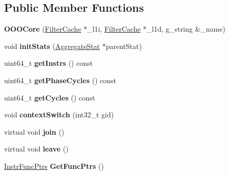 \subsection*{Public Member Functions}
\begin{DoxyCompactItemize}
\item 
\hypertarget{classOOOCore_a8e128fbcf5d1aad568c32303dc45ddd0}{{\bfseries O\-O\-O\-Core} (\hyperlink{classFilterCache}{Filter\-Cache} $\ast$\-\_\-l1i, \hyperlink{classFilterCache}{Filter\-Cache} $\ast$\-\_\-l1d, g\-\_\-string \&\-\_\-name)}\label{classOOOCore_a8e128fbcf5d1aad568c32303dc45ddd0}

\item 
\hypertarget{classOOOCore_a82046d72c1e1e24434dd388f7b5d945c}{void {\bfseries init\-Stats} (\hyperlink{classAggregateStat}{Aggregate\-Stat} $\ast$parent\-Stat)}\label{classOOOCore_a82046d72c1e1e24434dd388f7b5d945c}

\item 
\hypertarget{classOOOCore_a0f799816e26c267127b0a7f2e295921e}{uint64\-\_\-t {\bfseries get\-Instrs} () const }\label{classOOOCore_a0f799816e26c267127b0a7f2e295921e}

\item 
\hypertarget{classOOOCore_a62014c3805f0a2520474e2f0de8d8afb}{uint64\-\_\-t {\bfseries get\-Phase\-Cycles} () const }\label{classOOOCore_a62014c3805f0a2520474e2f0de8d8afb}

\item 
\hypertarget{classOOOCore_a5b527137a0b02e16bd3b8a1c0f38f985}{uint64\-\_\-t {\bfseries get\-Cycles} () const }\label{classOOOCore_a5b527137a0b02e16bd3b8a1c0f38f985}

\item 
\hypertarget{classOOOCore_a396ab9ae4b9e60827474fa0983919146}{void {\bfseries context\-Switch} (int32\-\_\-t gid)}\label{classOOOCore_a396ab9ae4b9e60827474fa0983919146}

\item 
\hypertarget{classOOOCore_ac66b3eb93727d17d0c6552832470bc27}{virtual void {\bfseries join} ()}\label{classOOOCore_ac66b3eb93727d17d0c6552832470bc27}

\item 
\hypertarget{classOOOCore_a035a4f843d7b3d7cabe0b7e28df30cce}{virtual void {\bfseries leave} ()}\label{classOOOCore_a035a4f843d7b3d7cabe0b7e28df30cce}

\item 
\hypertarget{classOOOCore_a0c7eb74407545d47223ab0975ffc8a0e}{\hyperlink{structInstrFuncPtrs}{Instr\-Func\-Ptrs} {\bfseries Get\-Func\-Ptrs} ()}\label{classOOOCore_a0c7eb74407545d47223ab0975ffc8a0e}


\end{DoxyCompactItemize}
